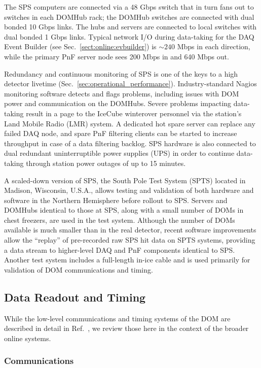 The SPS computers are connected via a 48 Gbps switch that in turn fans out
to switches in each DOMHub rack; the DOMHub switches are connected with
dual bonded 10 Gbps links.  The hubs and servers are connected to local
switches with dual bonded 1 Gbps links.  Typical network I/O during
data-taking for the DAQ Event Builder (see
Sec.~\ref{sect:online:evbuilder}) is $\sim240$ Mbps in each direction, while
the primary PnF server node sees 200 Mbps in and 640 Mbps out.

Redundancy and continuous monitoring of SPS is one of the keys to a high
detector livetime (Sec.~\ref{sec:operational_performance}).
Industry-standard Nagios monitoring software detects and flags problems, 
including issues with DOM power and communication on the DOMHubs.  Severe
problems impacting data-taking result in a page to the IceCube winterover 
personnel via the station's Land Mobile Radio (LMR) system.  A dedicated
hot spare server can replace any failed DAQ node, and spare PnF filtering
clients can be started to increase throughput in case of a data filtering
backlog.  SPS hardware is also connected to dual redundant uninterruptible
power supplies (UPS) in order to continue data-taking through station power
outages of up to 15 minutes.

A scaled-down version of SPS, the South Pole Test System (SPTS) located in
Madison, Wisconsin, U.S.A., allows testing and validation of both hardware
and software in the Northern Hemisphere before rollout to SPS.  Servers and DOMHubs
identical to those at SPS, along with a small number of DOMs in chest
freezers, are used in the test system.  Although the number of DOMs
available is much smaller than in the real detector, recent software
improvements allow the ``replay'' of pre-recorded raw SPS hit data
on SPTS systems, providing a data stream to higher-level DAQ and PnF
components identical to SPS.  Another test system includes a full-length
in-ice cable and is used primarily for validation of DOM communications and
timing.

\subsection{Data Readout and Timing}

While the low-level communications and timing systems of the DOM are
described in detail in Ref.~\cite{ref:domdaq}, we review those here in the
context of the broader online systems.

\subsubsection{\label{sect:online:comms}Communications}

